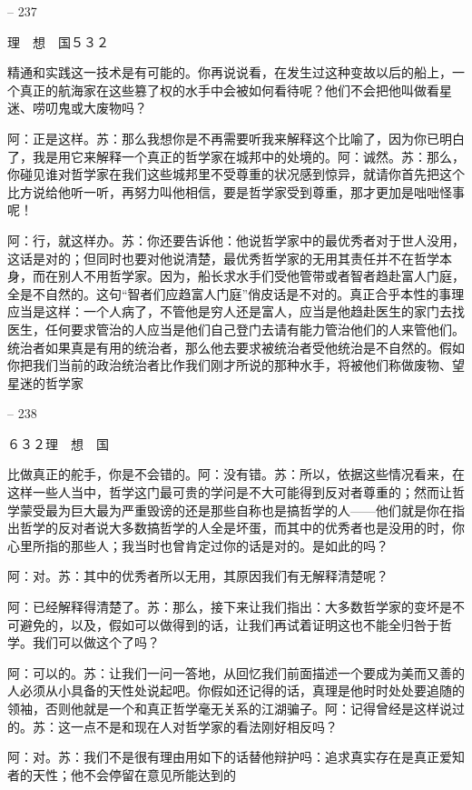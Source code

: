 \documentclass[11pt,oneside]{book}
\begin{document}
\begin{common-format}
    

-- 237

    理　想　国５３２

    精通和实践这一技术是有可能的。你再说说看，在发生过这种变故以后的船上，一个真正的航海家在这些篡了权的水手中会被如何看待呢？他们不会把他叫做看星迷、唠叨鬼或大废物吗？

    阿：正是这样。苏：那么我想你是不再需要听我来解释这个比喻了，因为你已明白了，我是用它来解释一个真正的哲学家在城邦中的处境的。阿：诚然。苏：那么，你碰见谁对哲学家在我们这些城邦里不受尊重的状况感到惊异，就请你首先把这个比方说给他听一听，再努力叫他相信，要是哲学家受到尊重，那才更加是咄咄怪事呢！

    阿：行，就这样办。苏：你还要告诉他：他说哲学家中的最优秀者对于世人没用，这话是对的；但同时也要对他说清楚，最优秀哲学家的无用其责任并不在哲学本身，而在别人不用哲学家。因为，船长求水手们受他管带或者智者趋赴富人门庭，全是不自然的。这句“智者们应趋富人门庭”俏皮话是不对的。真正合乎本性的事理应当是这样：一个人病了，不管他是穷人还是富人，应当是他趋赴医生的家门去找医生，任何要求管治的人应当是他们自己登门去请有能力管治他们的人来管他们。统治者如果真是有用的统治者，那么他去要求被统治者受他统治是不自然的。假如你把我们当前的政治统治者比作我们刚才所说的那种水手，将被他们称做废物、望星迷的哲学家

    

-- 238

    ６３２理　想　国

    比做真正的舵手，你是不会错的。阿：没有错。苏：所以，依据这些情况看来，在这样一些人当中，哲学这门最可贵的学问是不大可能得到反对者尊重的；然而让哲学蒙受最为巨大最为严重毁谤的还是那些自称也是搞哲学的人——他们就是你在指出哲学的反对者说大多数搞哲学的人全是坏蛋，而其中的优秀者也是没用的时，你心里所指的那些人；我当时也曾肯定过你的话是对的。是如此的吗？

    阿：对。苏：其中的优秀者所以无用，其原因我们有无解释清楚呢？

    阿：已经解释得清楚了。苏：那么，接下来让我们指出：大多数哲学家的变坏是不可避免的，以及，假如可以做得到的话，让我们再试着证明这也不能全归咎于哲学。我们可以做这个了吗？

    阿：可以的。苏：让我们一问一答地，从回忆我们前面描述一个要成为美而又善的人必须从小具备的天性处说起吧。你假如还记得的话，真理是他时时处处要追随的领袖，否则他就是一个和真正哲学毫无关系的江湖骗子。阿：记得曾经是这样说过的。苏：这一点不是和现在人对哲学家的看法刚好相反吗？

    阿：对。苏：我们不是很有理由用如下的话替他辩护吗：追求真实存在是真正爱知者的天性；他不会停留在意见所能达到的


\end{common-format}
\end{document}
